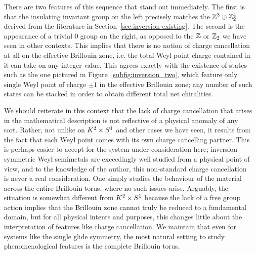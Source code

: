 There are two features of this sequence that stand out immediately. The first is that the insulating invariant group on the left precisely matches the $\mathbb{Z}^3\oplus\mathbb{Z}_2^4$ derived from the literature in Section~\ref{sec:inversion-existing}. The second is the appearance of a trivial 0 group on the right, as opposed to the $\mathbb{Z}$ or $\mathbb{Z}_2$ we have seen in other contexts. This implies that there is no notion of charge cancellation at all on the effective Brillouin zone, i.e. the total Weyl point charge contained in it can take on any integer value. This agrees exactly with the existence of states such as the one pictured in Figure~\ref{subfig:inversion_two}, which feature only single Weyl point of charge $\pm1$ in the effective Brillouin zone; any number of such states can be stacked in order to obtain different total net chiralities.

We should reiterate in this context that the lack of charge cancellation that arises in the mathematical description is not reflective of a physical anomaly of any sort. Rather, not unlike on $K^2\times S^1$ and other cases we have seen, it results from the fact that each Weyl point comes with its own charge cancelling partner. This is perhaps easier to accept for the system under consideration here; inversion symmetric Weyl semimetals are exceedingly well studied from a physical point of view, and to the knowledge of the author, this non-standard charge cancellation is never a real consideration. One simply studies the behaviour of the material across the entire Brillouin torus, where no such issues arise. Arguably, the situation is somewhat different from $K^2\times S^1$ because the lack of a free group action implies that the Brillouin zone cannot truly be reduced to a fundamental domain, but for all physical intents and purposes, this changes little about the interpretation of features like charge cancellation. We maintain that even for systems like the single glide symmetry, the most natural setting to study phenomenological features is the complete Brillouin torus.

